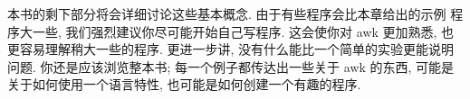 本书的剩下部分将会详细讨论这些基本概念. 由于有些程序会比本章给出的示例
程序大一些, 我们强烈建议你尽可能开始自己写程序. 这会使你对 awk 更加熟悉,
也更容易理解稍大一些的程序. 更进一步讲, 没有什么能比一个简单的实验更能说明
问题. 你还是应该浏览整本书; 每一个例子都传达出一些关于 awk 的东西, 可能是
关于如何使用一个语言特性, 也可能是如何创建一个有趣的程序.
